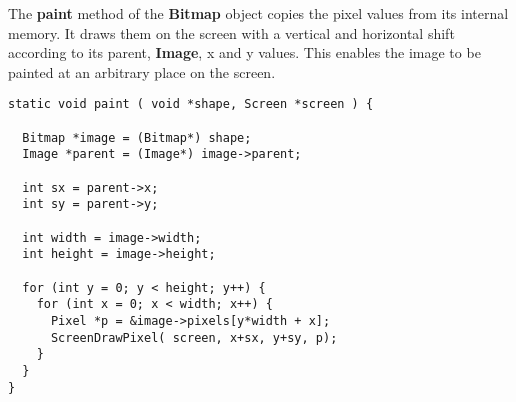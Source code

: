 The {\bf paint} method of the {\bf Bitmap} object copies the pixel
values from its internal memory. It draws them on the screen with a
vertical and horizontal shift according to its parent, {\bf Image}, x
and y values. This enables the image to be painted at an arbitrary
place on the screen.
\\
\begin{lstlisting}
static void paint ( void *shape, Screen *screen ) {

  Bitmap *image = (Bitmap*) shape;
  Image *parent = (Image*) image->parent;

  int sx = parent->x;
  int sy = parent->y;

  int width = image->width;
  int height = image->height;

  for (int y = 0; y < height; y++) {
    for (int x = 0; x < width; x++) {
      Pixel *p = &image->pixels[y*width + x];
      ScreenDrawPixel( screen, x+sx, y+sy, p);
    }
  }
}
\end{lstlisting}
